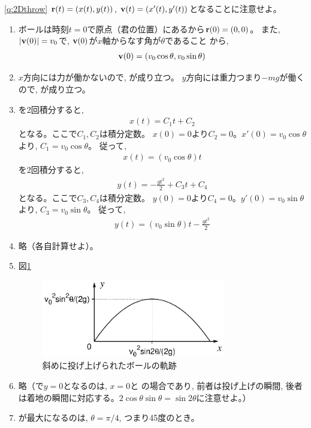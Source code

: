 \ref{q:2Dthrow}
${\bf r}(t)=(x(t), y(t))$, ${\bf v}(t)=(x'(t), y'(t))$となることに注意せよ。
\begin{enumerate}
\item ボールは時刻$t=0$で原点（君の位置）にあるから${\bf r}(0)=(0,0)$。
また, $|{\bf v}(0)|=v_0$で, ${\bf v}(0)$が$x$軸からなす角が$\theta$であること
から, 
\begin{eqnarray}{\bf v}(0)=(v_0\cos\theta, v_0\sin\theta)\end{eqnarray}
\item $x$方向には力が働かないので, が成り立つ。
$y$方向には重力つまり$-mg$が働くので, が成り立つ。
\item {}を2回積分すると, 
\begin{eqnarray}x(t)=C_1t+C_2\end{eqnarray}
となる。ここで$C_1, C_2$は積分定数。
$x(0)=0$より$C_2=0$。$x'(0)=v_0\cos\theta$より, $C_1=v_0\cos\theta$。
従って, 
\begin{eqnarray}x(t)=(v_0\cos\theta)t\end{eqnarray}
を2回積分すると, 
\begin{eqnarray}y(t)=-\frac{gt^2}{2}+C_3t+C_4\end{eqnarray}
となる。ここで$C_3, C_4$は積分定数。
$y(0)=0$より$C_4=0$。$y'(0)=v_0\sin\theta$より, $C_3=v_0\sin\theta$。
従って, 
\begin{eqnarray}y(t)=(v_0\sin\theta)t-\frac{gt^2}{2}\end{eqnarray}
\item 略（各自計算せよ）。
\item 図\ref{fig:throw_ball_slant}
\begin{figure}[h]
    \centering
    \includegraphics[width=8cm]{throw_ball_slant.eps}
    \caption{斜めに投げ上げられたボールの軌跡}\label{fig:throw_ball_slant}
\end{figure}
\item 略（で$y=0$となるのは, $x=0$と
の場合であり, 前者は投げ上げの瞬間, 
後者は着地の瞬間に対応する。$2\cos\theta\sin\theta=\sin2\theta$に注意せよ。）
\item {}が最大になるのは, $\theta=\pi/4$, つまり45度のとき。
\end{enumerate}
\mv


